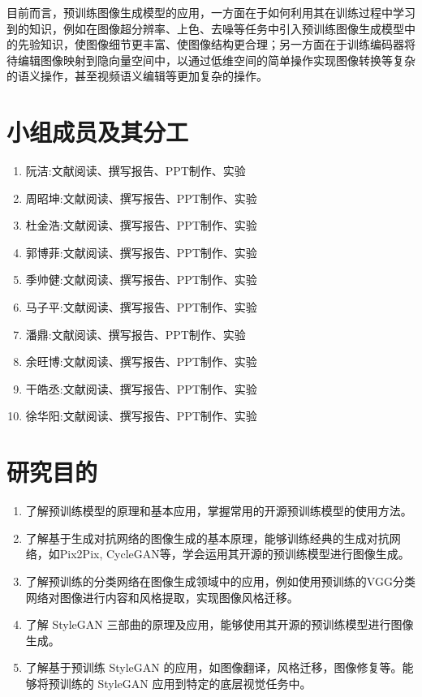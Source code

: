 目前而言，预训练图像生成模型的应用，一方面在于如何利用其在训练过程中学习到的知识，例如在图像超分辨率、上色、去噪等任务中引入预训练图像生成模型中的先验知识，使图像细节更丰富、使图像结构更合理；另一方面在于训练编码器将待编辑图像映射到隐向量空间中，以通过低维空间的简单操作实现图像转换等复杂的语义操作，甚至视频语义编辑等更加复杂的操作。

\section{小组成员及其分工}

\begin{enumerate}
 \item 阮洁:文献阅读、撰写报告、PPT制作、实验
 \item 周昭坤:文献阅读、撰写报告、PPT制作、实验
 \item 杜金浩:文献阅读、撰写报告、PPT制作、实验
 \item 郭博菲:文献阅读、撰写报告、PPT制作、实验
 \item 季帅健:文献阅读、撰写报告、PPT制作、实验
 \item 马子平:文献阅读、撰写报告、PPT制作、实验
 \item 潘鼎:文献阅读、撰写报告、PPT制作、实验
 \item 余旺博:文献阅读、撰写报告、PPT制作、实验
 \item 干皓丞:文献阅读、撰写报告、PPT制作、实验
 \item 徐华阳:文献阅读、撰写报告、PPT制作、实验
\end{enumerate}


\section{研究目的}

\begin{enumerate}
 \item 了解预训练模型的原理和基本应用，掌握常用的开源预训练模型的使用方法。
 \item 了解基于生成对抗网络的图像生成的基本原理，能够训练经典的生成对抗网络，如Pix2Pix, CycleGAN等，学会运用其开源的预训练模型进行图像生成。
 \item 了解预训练的分类网络在图像生成领域中的应用，例如使用预训练的VGG分类网络对图像进行内容和风格提取，实现图像风格迁移。
 \item 了解 StyleGAN 三部曲的原理及应用，能够使用其开源的预训练模型进行图像生成。
 \item 了解基于预训练 StyleGAN 的应用，如图像翻译，风格迁移，图像修复等。能够将预训练的 StyleGAN 应用到特定的底层视觉任务中。
\end{enumerate}

